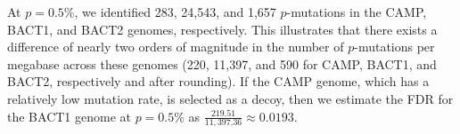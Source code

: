 At $p=0.5$\%, we identified 283, 24,543, and 1,657 $p$-mutations in the CAMP, BACT1, and BACT2 genomes, respectively. This illustrates that there exists a difference of nearly two orders of magnitude in the number of $p$-mutations per megabase across these genomes (220, 11,397, and 590 for CAMP, BACT1, and BACT2, respectively and after rounding). If the CAMP genome, which has a relatively low mutation rate, is selected as a decoy, then we estimate the FDR for the BACT1 genome at $p=0.5\%$ as $\frac{219.51}{11,397.36} \approx 0.0193$.\endinput